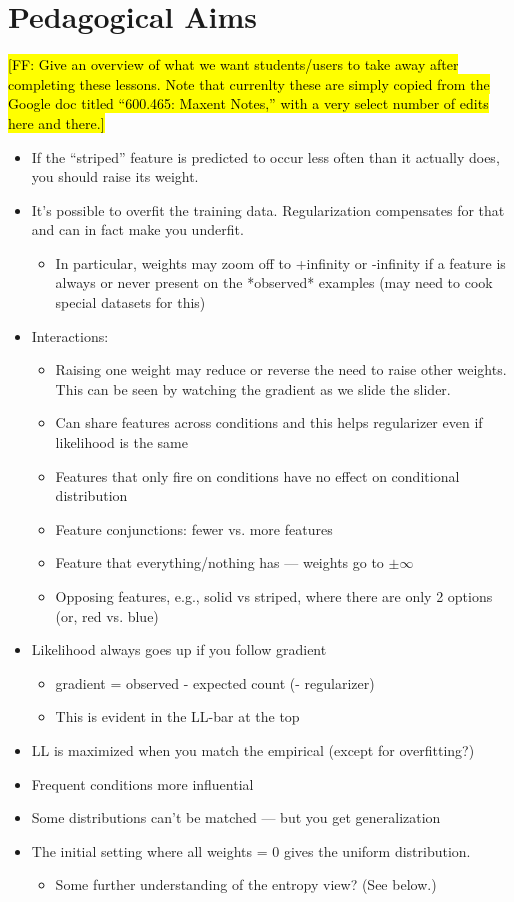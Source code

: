 \documentclass[11pt,letterpaper]{article}
\newcommand{\Note}[1]{}
\renewcommand{\Note}[1]{\hl{[#1]}}
\newcommand{\NoteSigned}[3]{{\sethlcolor{#2}\Note{#1: #3}}}
\newcommand{\NoteFF}[1]{\NoteSigned{FF}{LightBlue}{#1}}
\begin{document}
\section{Pedagogical Aims}
\NoteFF{Give an overview of what we want students/users to take away after completing these lessons. Note that currenlty these are simply copied from the Google doc titled ``600.465: Maxent Notes,'' with a very select number of edits here and there.}
\begin{itemize}
\item If the “striped” feature is predicted to occur less often than it actually does, you should raise its weight.
\item It’s possible to overfit the training data.  Regularization compensates for that and can in fact make you underfit.
\begin{itemize}
\item In particular, weights may zoom off to +infinity or -infinity if a feature is always or never present on the *observed* examples (may need to cook special datasets for this)
\end{itemize}
\item Interactions:
\begin{itemize} 
\item Raising one weight may reduce or reverse the need to raise other weights.  This can be seen by watching the gradient as we slide the slider.
\item Can share features across conditions and this helps regularizer even if likelihood is the same
\item Features that only fire on conditions have no effect on conditional distribution
\item Feature conjunctions: fewer vs. more features
\item Feature that everything/nothing has --- weights go to $\pm \infty$
\item Opposing features, e.g., solid vs striped, where there are only 2 options (or, red vs. blue)
\end{itemize}
\item Likelihood always goes up if you follow gradient
\begin{itemize}
\item gradient = observed - expected count (- regularizer)
\item This is evident in the LL-bar at the top
\end{itemize}
\item LL is maximized when you match the empirical (except for overfitting?)
\item Frequent conditions more influential
\item Some distributions can't be matched --- but you get generalization
\item The initial setting where all weights = 0 gives the uniform distribution.
\begin{itemize}
\item Some further understanding of the entropy view?  (See below.)
\end{itemize}
\end{itemize}
\end{document}
